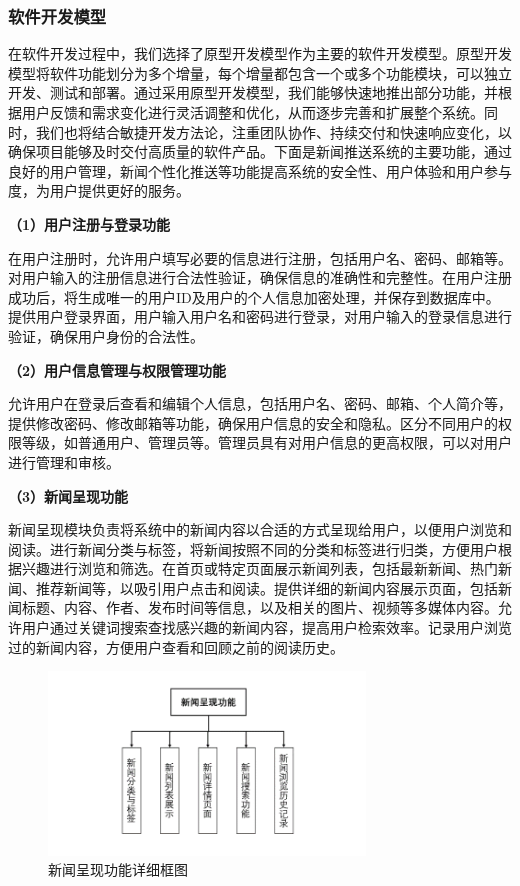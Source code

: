 \documentclass[withoutpreface,bwprint]{cumcmthesis} %
\begin{document}
	\subsubsection{ 软件开发模型}
	在软件开发过程中，我们选择了原型开发模型作为主要的软件开发模型。原型开发模型将软件功能划分为多个增量，每个增量都包含一个或多个功能模块，可以独立开发、测试和部署。通过采用原型开发模型，我们能够快速地推出部分功能，并根据用户反馈和需求变化进行灵活调整和优化，从而逐步完善和扩展整个系统。同时，我们也将结合敏捷开发方法论，注重团队协作、持续交付和快速响应变化，以确保项目能够及时交付高质量的软件产品。下面是新闻推送系统的主要功能，通过良好的用户管理，新闻个性化推送等功能提高系统的安全性、用户体验和用户参与度，为用户提供更好的服务。\par
	\textbf{（1）用户注册与登录功能}\par
	在用户注册时，允许用户填写必要的信息进行注册，包括用户名、密码、邮箱等。对用户输入的注册信息进行合法性验证，确保信息的准确性和完整性。在用户注册成功后，将生成唯一的用户ID及用户的个人信息加密处理，并保存到数据库中。提供用户登录界面，用户输入用户名和密码进行登录，对用户输入的登录信息进行验证，确保用户身份的合法性。\par
	\textbf{（2）用户信息管理与权限管理功能}\par
	允许用户在登录后查看和编辑个人信息，包括用户名、密码、邮箱、个人简介等，提供修改密码、修改邮箱等功能，确保用户信息的安全和隐私。区分不同用户的权限等级，如普通用户、管理员等。管理员具有对用户信息的更高权限，可以对用户进行管理和审核。\par
	\textbf{（3）新闻呈现功能}\par
	新闻呈现模块负责将系统中的新闻内容以合适的方式呈现给用户，以便用户浏览和阅读。进行新闻分类与标签，将新闻按照不同的分类和标签进行归类，方便用户根据兴趣进行浏览和筛选。在首页或特定页面展示新闻列表，包括最新新闻、热门新闻、推荐新闻等，以吸引用户点击和阅读。提供详细的新闻内容展示页面，包括新闻标题、内容、作者、发布时间等信息，以及相关的图片、视频等多媒体内容。允许用户通过关键词搜索查找感兴趣的新闻内容，提高用户检索效率。记录用户浏览过的新闻内容，方便用户查看和回顾之前的阅读历史。\par
	\begin{figure}[H]
		\centering
		\includegraphics[width=0.75\textwidth]{新闻呈现功能详细框图}
		\caption{新闻呈现功能详细框图}
		\label{fig:circuit-diagcam}
	\end{figure}
\end{document}
